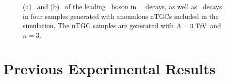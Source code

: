 \begin{figure}
\centering
        \vspace{-5mm}
        \vspace{-2mm}
    \caption[\mZZ\ and \pt\ of the leading \Z\ boson in \sm\ \ZZllll\ decays, as
well as \ZZllll\ decays in four samples generated with anomalous
nTGCs included in the simulation.]{\small
(a) \mZZ\ and (b) \pt\ of the leading \Z\ boson in \sm\ \ZZllll\ decays, as
well as \ZZllll\ decays in four samples generated with anomalous
nTGCs included in the simulation. The nTGC samples are generated with
$\Lambda=3\tev$ and $n=3$.
}
    \label{fig:gen-comp-TGC}
\end{figure}


%
\section{Previous Experimental Results}
\label{sec:TheoryZZProduction-prevResults}

